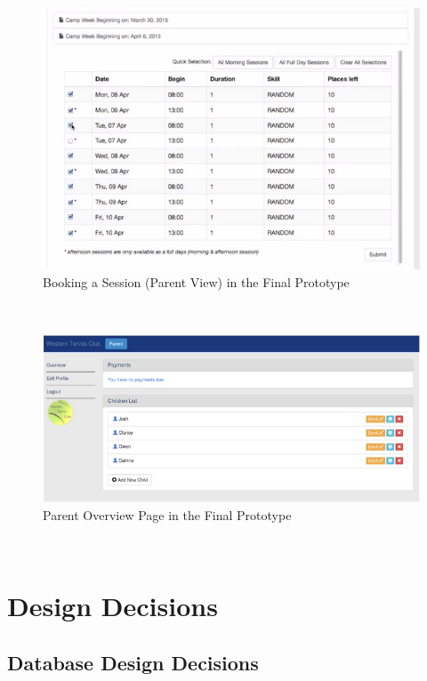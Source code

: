 \documentclass{l3proj}
\begin{document}
\\
{
\begin{figure}[h]
\caption{Booking a Session (Parent View) in the Final Prototype}
\centering
\includegraphics[scale=0.75]{parenttableFinal.jpg}
\end{figure}
}
\\
{
\begin{figure}[h]
\caption{Parent Overview Page in the Final Prototype}
\centering
\includegraphics[scale=0.75]{parentlistofchildren.jpg}
\end{figure}
}
\\

\section{Design Decisions}

\subsection{Database Design Decisions}
\end{document}
